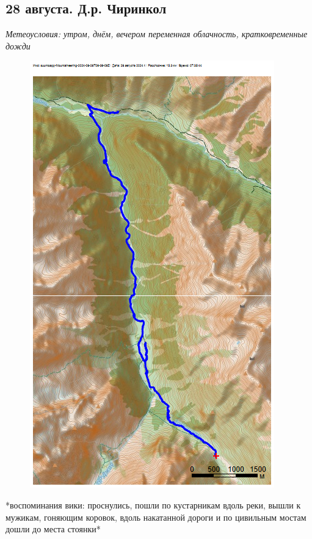 \subsection{28 августа. Д.р. Чиринкол}

\textit{Метеоусловия: утром, днём, вечером переменная облачность, кратковременные дожди}

\begin{figure}[h!]
	\centering
	\includegraphics[angle=0, width=0.7\linewidth]{../pics/mini_maps/28}
	\label{fig:mini_28}
\end{figure}

*воспоминания вики: проснулись, пошли по кустарникам вдоль реки, вышли к мужикам, гоняющим коровок, вдоль накатанной дороги и по цивильным мостам дошли до места стоянки*

\newpage